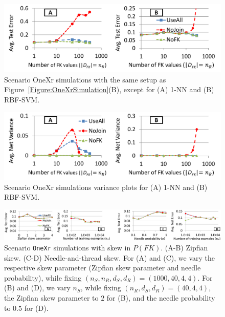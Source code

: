 \documentclass{vldb}
\begin{document}
\begin{figure}[t]
\centering
\includegraphics[width=0.99\linewidth]{onexr_svm_1nn.pdf}
\caption{Scenario OneXr simulations with the same setup as Figure~\ref{Figure:OneXrSimulation}(B), except for (A) 1-NN and (B) RBF-SVM.}
\label{Figure:OneXr1nnSVMSimulation}
\end{figure}

\begin{figure}[t]
\centering
\includegraphics[width=0.99\linewidth]{variance.pdf}
\caption{Scenario OneXr simulations variance plots for (A) 1-NN and (B) RBF-SVM.}
\label{Figure:OneXr1nnSVMSimulationVariance}
\end{figure}

\begin{figure}[t]
\centering
\includegraphics[width=2\columnwidth,height=\textheight,keepaspectratio]{skewfk_onexr.pdf}
\caption{Scenario \texttt{OneXr} simulations with skew in $P(FK)$. (A-B) Zipfian skew. (C-D) Needle-and-thread skew. For (A) and (C), we vary the respective skew parameter
(Zipfian skew parameter and needle probability), while fixing $(n_S, n_R, d_S, d_R) = (1000, 40, 4, 4)$. For (B) and (D), we vary $n_S$, while fixing $(n_R, d_S, d_R) = (40, 4, 4)$,
the Zipfian skew parameter to $2$ for (B), and the needle probability to $0.5$ for (D).
}
\label{Figure:OneXrZipfSimulation}
\end{figure}
\end{document}
